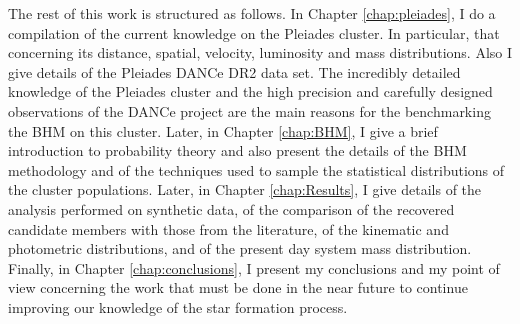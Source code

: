 The rest of this work is structured as follows. In Chapter \ref{chap:pleiades}, I do a compilation of the current knowledge on the Pleiades cluster. In particular, that concerning its distance, spatial, velocity, luminosity and mass distributions. Also I give details of the Pleiades DANCe DR2 data set. The incredibly detailed knowledge of the Pleiades cluster and the high precision and carefully designed observations of the DANCe project are the main reasons for the benchmarking the BHM on this cluster. Later, in Chapter \ref{chap:BHM}, I give a brief introduction to probability theory and also present the details of the BHM methodology and of the techniques used to sample the statistical distributions of the cluster populations. Later, in Chapter \ref{chap:Results}, I give details of the analysis performed on synthetic data, of the comparison of the recovered candidate members with those from the literature, of the kinematic and photometric distributions, and of the present day system mass distribution.  Finally, in Chapter \ref{chap:conclusions}, I present my conclusions and my point of view concerning the work that must be done in the near future to continue improving our knowledge of the star formation process.



